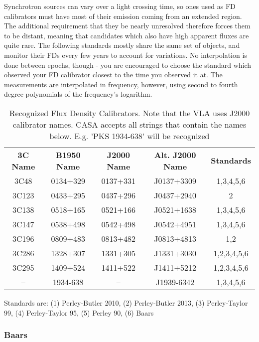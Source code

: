 Synchrotron sources can vary over a light crossing time, so ones used as FD
calibrators must have most of their emission coming from an extended region.
The additional requirement that they be nearly unresolved therefore forces them
to be distant, meaning that candidates which also have high apparent fluxes are
quite rare.  The following standards mostly share the same set of objects, and
monitor their FDs every few years to account for variations.  No interpolation
is done between epochs, though - you are encouraged to choose the standard
which observed your FD calibrator closest to the time you observed it at.
The measurements \underline{are} interpolated in frequency, however, using second to
fourth degree polynomials of the frequency's logarithm.

\begin{table}[h!]
\caption{Recognized Flux Density Calibrators. Note that the VLA uses
J2000 calibrator names. CASA accepts all strings that contain the
names below. E.g. 'PKS 1934-638' will be recognized
        {\label{table:conventions.fluxdensity.sources}}}
\begin{center}
\begin{tabular}{|ccccc|} \hline
 {\bf 3C Name}  & {\bf B1950 Name}& {\bf J2000 Name} & {\bf Alt. J2000
   Name} & {\bf Standards}\\
3C48  &  0134+329 &  0137+331 &  J0137+3309 & 1,3,4,5,6  \\
3C123 &  0433+295 &  0437+296 &  J0437+2940 &      2 \\
3C138 &  0518+165 &  0521+166 &  J0521+1638 &      1,3,4,5,6\\
3C147 &  0538+498 &  0542+498 &  J0542+4951 &      1,3,4,5,6\\
3C196 &  0809+483 &  0813+482 &  J0813+4813 &      1,2 \\
3C286 &  1328+307 &  1331+305 &  J1331+3030 &      1,2,3,4,5,6\\
3C295 &  1409+524 &  1411+522 &  J1411+5212 &      1,2,3,4,5,6\\
 --   &  1934-638 &    --     &  J1939-6342 &      1,3,4,5,6\\
\hline
\end{tabular}
\end{center}
Standards are: (1) Perley-Butler 2010, (2) Perley-Butler 2013, (3) Perley-Taylor 99, (4)
Perley-Taylor 95, (5) Perley 90, (6) Baars
\end{table}



\subsubsection{Baars}
\label{section:conventions.longwavelength.baars}

